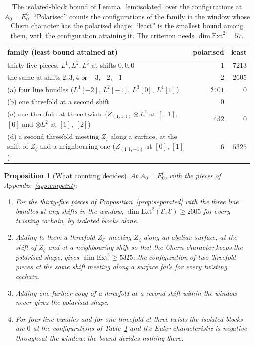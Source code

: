 \documentclass[11pt,reqno]{amsart}
\numberwithin{equation}{section}
\theoremstyle{plain}
\newtheorem{proposition}[theorem]{Proposition}
\theoremstyle{definition}
\newcommand{\Ext}{\mathrm{Ext}}
\begin{document}
\begin{table}[t]
\caption{The isolated-block bound of Lemma~\ref{lem:isolated} over the configurations at $A_{0}=E_{0}^{6}$. ``Polarised'' counts the configurations of the family in the window whose Chern character has the polarised shape; ``least'' is the smallest bound among them, with the configuration attaining it. The criterion needs $\dim\Ext^{2}=57$.}
\label{tab:e06count}
\centering
\footnotesize
\setlength{\tabcolsep}{3pt}
\begin{tabular}{@{}p{}rr@{}}
\hline
family (least bound attained at) & polarised & least \\
\hline
thirty-five pieces, $L^{1},L^{2},L^{3}$ at shifts $0,0,0$ & $1$ & $7213$ \\
the same at shifts $2,3,4$ or $-3,-2,-1$ & $2$ & $2605$ \\
(a) four line bundles ($L^{1}[-2]$, $L^{2}[-1]$, $L^{3}[0]$, $L^{4}[1]$) & $2401$ & $0$ \\
(b) one threefold at a second shift & $0$ & \\
(c) one threefold at three twists ($Z_{(1,1,1)}\otimes L^{1}$ at $[-1]$, $[0]$ and $\otimes L^{2}$ at $[1]$, $[2]$) & $432$ & $0$ \\
(d) a second threefold meeting $Z_{\zeta}$ along a surface, at the shift of $Z_{\zeta}$ and a neighbouring one ($Z_{(1,1,-1)}$ at $[0]$, $[1]$) & $6$ & $5325$ \\
\hline
\end{tabular}
\end{table}

\begin{proposition}[What counting decides]\label{prop:e06count}
At $A_{0}=E_{0}^{6}$, with the pieces of Appendix~\ref{app:cmpoint}:
\begin{enumerate}[label=\textup{(\roman*)}]
\item For the thirty-five pieces of Proposition~\ref{prop:separated} with the three line bundles at any shifts in the window, $\dim\Ext^{2}(\mathcal{E},\mathcal{E})\ge2605$ for every twisting cochain, by isolated blocks alone.
\item Adding to them a threefold $Z_{\zeta'}$ meeting $Z_{\zeta}$ along an abelian surface, at the shift of $Z_{\zeta}$ and at a neighbouring shift so that the Chern character keeps the polarised shape, gives $\dim\Ext^{2}\ge5325$: the configuration of two threefold pieces at the same shift meeting along a surface fails for every twisting cochain.
\item Adding one further copy of a threefold at a second shift within the window never gives the polarised shape.
\item For four line bundles and for one threefold at three twists the isolated blocks are $0$ at the configurations of Table~\ref{tab:e06count} and the Euler characteristic is negative throughout the window: the bound decides nothing there.
\end{enumerate}
\end{proposition}
\end{document}

